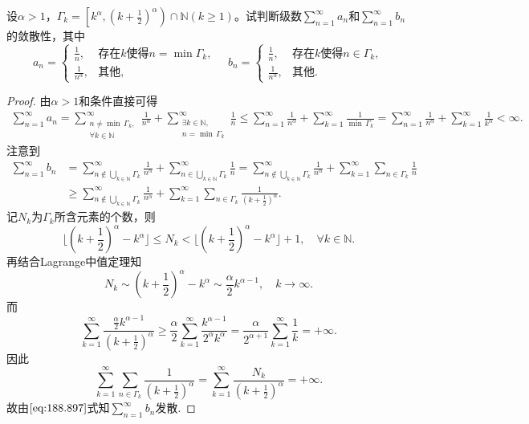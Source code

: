 \documentclass[../../main.tex]{subfiles}%
\begin{document}
\begin{example}
设$\alpha > 1$，$\Gamma_k = \left[ k^\alpha, \left( k + \frac{1}{2} \right)^\alpha \right) \cap \mathbb{N} (k \geqslant 1)$。试判断级数$\sum\limits_{n=1}^{\infty} a_n$和$\sum\limits_{n=1}^{\infty} b_n$的敛散性，其中
$$a_n = \begin{cases}
\frac{1}{n}, & \text{存在} k \text{使得} n = \min \Gamma_k, \\
\frac{1}{n^\alpha}, & \text{其他},
\end{cases} \quad b_n = \begin{cases}
\frac{1}{n}, & \text{存在} k \text{使得} n \in \Gamma_k, \\
\frac{1}{n^\alpha}, & \text{其他}.
\end{cases}$$
\end{example}
\begin{proof}
由$\alpha >1$和条件直接可得
\begin{align*}
\sum\limits_{n=1}^{\infty}a_n=
\sum\limits_{\substack{n\ne \min\,\Gamma_k,\\\forall k\in \mathbb{N}}}^{\infty}\frac{1}{n^{\alpha}}+
\sum\limits_{\substack{\exists k\in \mathbb{N},\\n=\min\,\Gamma_k}}^{\infty}\frac{1}{n}
\leqslant \sum\limits_{n=1}^{\infty}\frac{1}{n^{\alpha}}+
\sum\limits_{k=1}^{\infty}\frac{1}{\min\,\Gamma_k}=
\sum\limits_{n=1}^{\infty}\frac{1}{n^{\alpha}}+
\sum\limits_{k=1}^{\infty}\frac{1}{k^{\alpha}}<\infty.
\end{align*}
注意到
\begin{align}
\sum\limits_{n=1}^{\infty}{b_n}&=\sum\limits_{n\notin \bigcup_{k\in \mathbb{N}}{\Gamma _k}}^{\infty}{\frac{1}{n^{\alpha}}}+\sum\limits_{n\in \bigcup_{k\in \mathbb{N}}{\Gamma _k}}^{\infty}{\frac{1}{n}}=\sum\limits_{n\notin \bigcup_{k\in \mathbb{N}}{\Gamma _k}}^{\infty}{\frac{1}{n^{\alpha}}}+\sum\limits_{k=1}^{\infty}{\sum\limits_{n\in \Gamma _k}{\frac{1}{n}}}
\nonumber \\
&\geqslant \sum\limits_{n\notin \bigcup_{k\in \mathbb{N}}{\Gamma _k}}^{\infty}{\frac{1}{n^{\alpha}}}+\sum\limits_{k=1}^{\infty}{\sum\limits_{n\in \Gamma _k}{\frac{1}{\left( k+\frac{1}{2} \right) ^{\alpha}}}}.\label{eq:188.897}
\end{align}
记$N_k$为$\Gamma_k$所含元素的个数，则
$$\lfloor \left( k+\frac{1}{2} \right) ^{\alpha}-k^{\alpha} \rfloor \leqslant N_k<\lfloor \left( k+\frac{1}{2} \right) ^{\alpha}-k^{\alpha} \rfloor +1,\quad \forall k\in \mathbb{N} .$$
再结合Lagrange中值定理知
$$N_k\sim \left( k+\frac{1}{2} \right) ^{\alpha}-k^{\alpha}\sim \frac{\alpha}{2}k^{\alpha -1},\quad k\rightarrow \infty .$$
而
$$\sum\limits_{k=1}^{\infty}{\frac{\frac{\alpha}{2}k^{\alpha -1}}{\left( k+\frac{1}{2} \right) ^{\alpha}}}\geqslant \frac{\alpha}{2}\sum\limits_{k=1}^{\infty}{\frac{k^{\alpha -1}}{2^{\alpha}k^{\alpha}}}=\frac{\alpha}{2^{\alpha +1}}\sum\limits_{k=1}^{\infty}{\frac{1}{k}}=+\infty .$$
因此
$$\sum\limits_{k=1}^{\infty}{\sum\limits_{n\in \Gamma _k}{\frac{1}{\left( k+\frac{1}{2} \right) ^{\alpha}}}}=\sum\limits_{k=1}^{\infty}{\frac{N_k}{\left( k+\frac{1}{2} \right) ^{\alpha}}}=+\infty .$$
故由$\eqref{eq:188.897}$式知$\sum\limits_{n=1}^{\infty}{b_n}$发散.
\end{proof}
\end{document}
